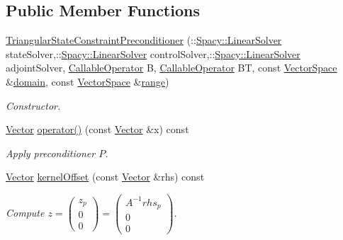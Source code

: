 \subsection*{Public Member Functions}
\begin{DoxyCompactItemize}
\item 
\hyperlink{classSpacy_1_1CG_1_1TriangularStateConstraintPreconditioner_a8bbfa8bf7bdfcd3c308d4dbec8c448d0_a8bbfa8bf7bdfcd3c308d4dbec8c448d0}{Triangular\+State\+Constraint\+Preconditioner} (\+::\hyperlink{namespaceSpacy_a7d5cd1c6fb9dd85aa345b536caf30bba_a7d5cd1c6fb9dd85aa345b536caf30bba}{Spacy\+::\+Linear\+Solver} state\+Solver,\+::\hyperlink{namespaceSpacy_a7d5cd1c6fb9dd85aa345b536caf30bba_a7d5cd1c6fb9dd85aa345b536caf30bba}{Spacy\+::\+Linear\+Solver} control\+Solver,\+::\hyperlink{namespaceSpacy_a7d5cd1c6fb9dd85aa345b536caf30bba_a7d5cd1c6fb9dd85aa345b536caf30bba}{Spacy\+::\+Linear\+Solver} adjoint\+Solver, \hyperlink{group__SpacyGroup_ga2b74020d806ad800795cdd97dab3466f_ga2b74020d806ad800795cdd97dab3466f}{Callable\+Operator} B, \hyperlink{group__SpacyGroup_ga2b74020d806ad800795cdd97dab3466f_ga2b74020d806ad800795cdd97dab3466f}{Callable\+Operator} B\+T, const \hyperlink{classSpacy_1_1VectorSpace}{Vector\+Space} \&\hyperlink{classSpacy_1_1OperatorBase_a2588f9b3e0188820c4c494e63293dc6f_a2588f9b3e0188820c4c494e63293dc6f}{domain}, const \hyperlink{classSpacy_1_1VectorSpace}{Vector\+Space} \&\hyperlink{classSpacy_1_1OperatorBase_ab19d3b7a6f290b1079248f1e567e53d6_ab19d3b7a6f290b1079248f1e567e53d6}{range})
\begin{DoxyCompactList}\small\item\em Constructor. \end{DoxyCompactList}\item 
\hyperlink{classSpacy_1_1Vector}{Vector} \hyperlink{classSpacy_1_1CG_1_1TriangularStateConstraintPreconditioner_acf6c7985d679599274592917fdae5cbc_acf6c7985d679599274592917fdae5cbc}{operator()} (const \hyperlink{classSpacy_1_1Vector}{Vector} \&x) const 
\begin{DoxyCompactList}\small\item\em Apply preconditioner $P$. \end{DoxyCompactList}\item 
\hyperlink{classSpacy_1_1Vector}{Vector} \hyperlink{classSpacy_1_1CG_1_1TriangularStateConstraintPreconditioner_a959f6f366b868163b6cbeda7c96bcc8e_a959f6f366b868163b6cbeda7c96bcc8e}{kernel\+Offset} (const \hyperlink{classSpacy_1_1Vector}{Vector} \&rhs) const 
\begin{DoxyCompactList}\small\item\em Compute $ z = \left( \begin{array}{c} z_p \\ 0 \\ 0 \end{array} \right) = \left( \begin{array}{c} A^{-1}rhs_p \\ 0 \\ 0 \end{array} \right) $. \end{DoxyCompactList}\item 

\end{DoxyCompactItemize}
